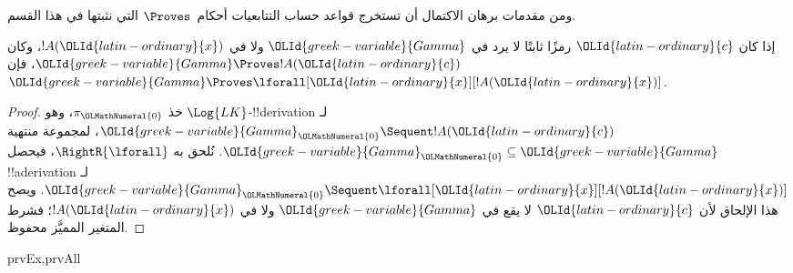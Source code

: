 \documentclass[../../../include/open-logic-section]{subfiles}
\begin{document}

\begin{explain}
  ومن مقدمات برهان الاكتمال أن تستخرج قواعد حساب التتابعيات أحكام~$\Proves$ التي نثبتها في هذا القسم.
\end{explain}

\begin{thm}
 إذا كان $\OLId{latin-ordinary}{c}$ رمزًا ثابتًا لا يرد
في $\OLId{greek-variable}{Gamma}$ ولا في $!A(\OLId{latin-ordinary}{x})$، وكان $\OLId{greek-variable}{Gamma} \Proves !A(\OLId{latin-ordinary}{c})$، فإن
$\OLId{greek-variable}{Gamma} \Proves \lforall[\OLId{latin-ordinary}{x}][!A(\OLId{latin-ordinary}{x})]$.
\end{thm}

\begin{proof}
خذ $\pi_\OLMathNumeral{0}$، وهو $\Log{LK}$-!!{derivation} لـ
$\OLId{greek-variable}{Gamma}_\OLMathNumeral{0} \Sequent !A(\OLId{latin-ordinary}{c})$، لمجموعة منتهية $\OLId{greek-variable}{Gamma}_\OLMathNumeral{0} \subseteq \OLId{greek-variable}{Gamma}$.
نُلحق به $\RightR{\lforall}$، فيحصل !!a{derivation} لـ
$\OLId{greek-variable}{Gamma}_\OLMathNumeral{0} \Sequent \lforall[\OLId{latin-ordinary}{x}][!A(\OLId{latin-ordinary}{x})]$.
ويصح هذا الإلحاق لأن $\OLId{latin-ordinary}{c}$ لا يقع في
$\OLId{greek-variable}{Gamma}$ ولا في $!A(\OLId{latin-ordinary}{x})$؛ فشرط المتغير المميَّز محفوظ.
\end{proof}

\begin{prop}
\begin{tagenumerate}{prvEx,prvAll}
\end{tagenumerate}
\end{prop}
\end{document}
